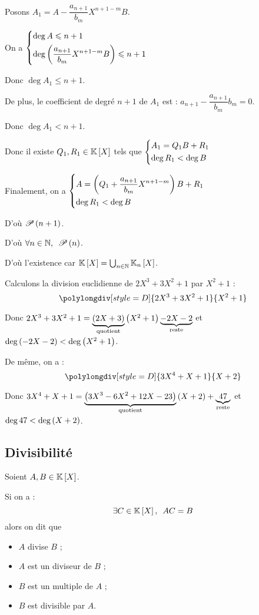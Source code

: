 \begin{dem}
Posons \(A_1=A-\dfrac{a_{n+1}}{b_m}X^{n+1-m}B\).

On a \(\begin{dcases}\deg A\leq n+1 \\ \deg\paren{\dfrac{a_{n+1}}{b_m}X^{n+1-m}B}\leq n+1\end{dcases}\)

Donc \(\deg A_1\leq n+1\).

De plus, le coefficient de degré \(n+1\) de \(A_1\) est : \(a_{n+1}-\dfrac{a_{n+1}}{b_m}b_m=0\).

Donc \(\deg A_1<n+1\).

Donc il existe \(Q_1,R_1\in\poly\) tels que \(\begin{dcases}A_1=Q_1B+R_1 \\ \deg R_1<\deg B\end{dcases}\)

Finalement, on a \(\begin{dcases}A=\paren{Q_1+\dfrac{a_{n+1}}{b_m}X^{n+1-m}}B+R_1 \\ \deg R_1<\deg B\end{dcases}\)

D'où \(\P{n+1}\).

D'où \(\quantifs{\forall n\in\N}\P{n}\).

D'où l'existence car \(\poly=\bigunion_{n\in\N}\poly[\K_n]\).
\end{dem}

\begin{ex}
Calculons la division euclidienne de \(2X^3+3X^2+1\) par \(X^2+1\) : \[\polylongdiv[style=D]{2X^3+3X^2+1}{X^2+1}\]

Donc \(2X^3+3X^2+1=\underbrace{\paren{2X+3}}_{\text{quotient}}\paren{X^2+1}\underbrace{-2X-2}_{\text{reste}}\) et \(\deg\paren{-2X-2}<\deg\paren{X^2+1}\).

De même, on a : \[\polylongdiv[style=D]{3X^4+X+1}{X+2}\]

Donc \(3X^4+X+1=\underbrace{\paren{3X^3-6X^2+12X-23}}_{\text{quotient}}\paren{X+2}+\underbrace{47}_{\text{reste}}\) et \(\deg47<\deg\paren{X+2}\).
\end{ex}

\subsection{Divisibilité}

\begin{defi}
Soient \(A,B\in\poly\).

Si on a : \[\quantifs{\exists C\in\poly}AC=B\] alors on dit que \begin{itemize}
\item \(A\) divise \(B\) ;
\item \(A\) est un diviseur de \(B\) ;
\item \(B\) est un multiple de \(A\) ;
\item \(B\) est divisible par \(A\).
\end{itemize}
\end{defi}

